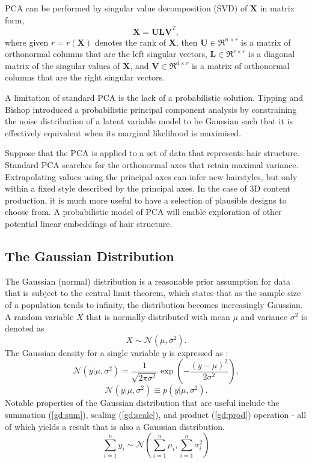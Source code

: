 \documentclass[ %
author={Dillon Keith Diep},
supervisor={Dr. Carl Henrik Ek},
degree={MEng},
title={ART-CG:},
subtitle={Assisted Real-time Content Generation of 3D Hair by Learning Manifolds},
type={Research},
year={2017} ]{dissertation}
\begin{document}
PCA can be performed by singular value decomposition (SVD) of $\bm{X}$ in matrix form, \cite{pca2002}
$$\bm{X=ULV}^T,$$
where given $r = r(\bm{X})$ denotes the rank of $\bm{X}$, then
$\bm{U} \in \Re^{n \times r}$ is a matrix of orthonormal columns that are the left singular vectors,
$\bm{L} \in \Re^{r \times r}$ is a diagonal matrix of the singular values of $\bm{X}$, and
$\bm{V} \in \Re^{d \times r}$ is a matrix of orthonormal columns that are the right singular vectors.

A limitation of standard PCA is the lack of a probabilistic solution. Tipping and Bishop introduced a probabilistic principal component analysis by constraining the noise distribution of a latent variable model to be Gaussian such that it is effectively equivalent when its marginal likelihood is maximised. \cite{ppca}

Suppose that the PCA is applied to a set of data that represents hair structure. Standard PCA searches for the orthonormal axes that retain maximal variance. Extrapolating values using the principal axes can infer new hairstyles, but only within a fixed style described by the principal axes. In the case of 3D content production, it is much more useful to have a selection of plausible designs to choose from. A probabilistic model of PCA will enable exploration of other potential linear embeddings of hair structure.


\subsection{The Gaussian Distribution}
The Gaussian (normal) distribution is a reasonable prior assumption for data that is subject to the central limit theorem, which states that as the sample size of a population tends to infinity, the distribution becomes increasingly Gaussian. \cite[p.78]{bishop}
A random variable $X$ that is normally distributed with mean $\mu$ and variance $\sigma^2$ is denoted as
$$X\sim\mathcal{N}(\mu, \sigma^2).$$
The Gaussian density for a single variable $y$ is expressed as \cite[p.78]{bishop}:
$$\mathcal{N}(y|\mu, \sigma^2)=\frac{1}{\sqrt{2\pi\sigma^2}}\exp\left(-\frac{(y-\mu)^2}{2\sigma^2}\right),$$
$$\mathcal{N}(y|\mu,\sigma^2) \equiv p(y|\mu,\sigma^2).$$
Notable properties of the Gaussian distribution that are useful include the summation (\ref{gd:sum}), scaling (\ref{gd:scale}), and product (\ref{gd:prod}) operation - all of which yields a result that is also a Gaussian distribution. \cite[p.200]{gp}
\begin{equation} \label{gd:sum}
\sum^n_{i=1}y_i\sim\mathcal{N}(\sum^n_{i=1}\mu_i,\sum^n_{i=1}\sigma^2_i)
\end{equation}
\end{document}
